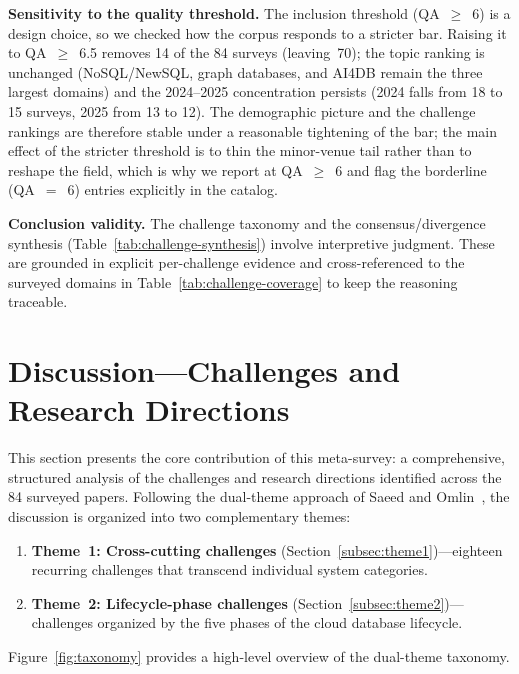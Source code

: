 \documentclass[a4paper,fleqn]{cas-sc}
\begin{document}
\textbf{Sensitivity to the quality threshold.} The inclusion threshold (QA~$\geq$~6) is a design choice, so we checked how the corpus responds to a stricter bar. Raising it to QA~$\geq$~6.5 removes 14 of the 84 surveys (leaving~70); the topic ranking is unchanged (NoSQL/NewSQL, graph databases, and AI4DB remain the three largest domains) and the 2024--2025 concentration persists (2024 falls from 18 to 15 surveys, 2025 from 13 to 12). The demographic picture and the challenge rankings are therefore stable under a reasonable tightening of the bar; the main effect of the stricter threshold is to thin the minor-venue tail rather than to reshape the field, which is why we report at QA~$\geq$~6 and flag the borderline (QA~$=$~6) entries explicitly in the catalog. 

\textbf{Conclusion validity.} The challenge taxonomy and the consensus/divergence synthesis (Table~\ref{tab:challenge-synthesis}) involve interpretive judgment. These are grounded in explicit per-challenge evidence and cross-referenced to the surveyed domains in Table~\ref{tab:challenge-coverage} to keep the reasoning traceable.


\section{Discussion---Challenges and Research Directions}
\label{sec:discussion}

This section presents the core contribution of this meta-survey: a comprehensive, structured analysis of the challenges and research directions identified across the 84 surveyed papers. Following the dual-theme approach of Saeed and Omlin~\cite{Saeed2023XAI}, the discussion is organized into two complementary themes:

\begin{enumerate}
    \item \textbf{Theme~1: Cross-cutting challenges} (Section~\ref{subsec:theme1})---eighteen recurring challenges that transcend individual system categories.
    \item \textbf{Theme~2: Lifecycle-phase challenges} (Section~\ref{subsec:theme2})---challenges organized by the five phases of the cloud database lifecycle.
\end{enumerate}

Figure~\ref{fig:taxonomy} provides a high-level overview of the dual-theme taxonomy.
\end{document}

